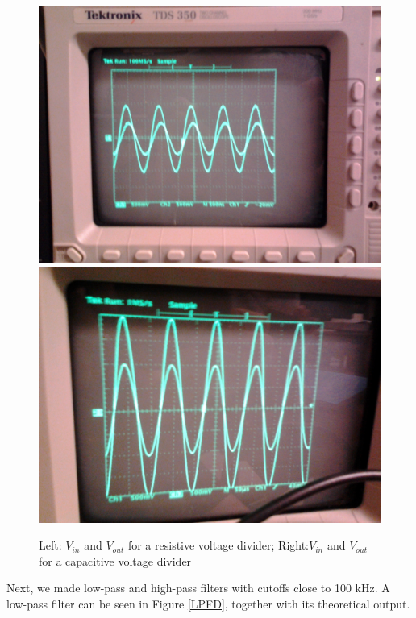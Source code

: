\documentclass[11pt]{article}
\begin{document}
\begin{figure}
\centering
\includegraphics[scale=0.1]{vd}
\includegraphics[scale=0.1]{photo1}
\caption{Left: $V_{in}$ and $V_{out}$ for a resistive voltage divider; Right:$V_{in}$ and $V_{out}$ for a capacitive voltage divider \label{VDs}}
\end{figure}
Next, we made low-pass and high-pass filters with cutoffs close to 100 kHz. A low-pass filter can be seen in Figure \ref{LPFD}, together with its theoretical output.
\end{document}
